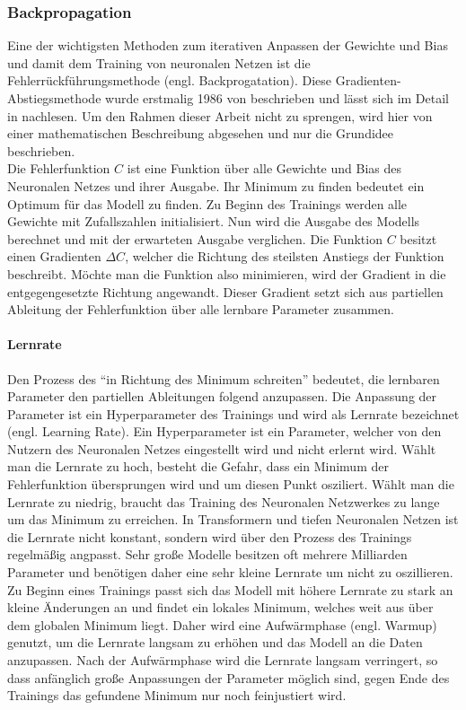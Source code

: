 \subsubsection{Backpropagation}
Eine der wichtigsten Methoden zum iterativen Anpassen der Gewichte und Bias und damit dem Training von neuronalen Netzen ist die Fehlerrückführungsmethode (engl.
Backprogatation).
Diese Gradienten-Abstiegsmethode wurde erstmalig 1986 von \citet{backpropagation} beschrieben und lässt sich im Detail in \citet{neuronale-netze} nachlesen.
Um den Rahmen dieser Arbeit nicht zu sprengen, wird hier von einer mathematischen Beschreibung abgesehen und nur die Grundidee beschrieben.\\

Die Fehlerfunktion $C$ ist eine Funktion über alle Gewichte und Bias des Neuronalen Netzes und ihrer Ausgabe.
Ihr Minimum zu finden bedeutet ein Optimum für das Modell zu finden.
Zu Beginn des Trainings werden alle Gewichte mit Zufallszahlen initialisiert.
Nun wird die Ausgabe des Modells berechnet und mit der erwarteten Ausgabe verglichen.
Die Funktion $C$ besitzt einen Gradienten $\Delta C$, welcher die Richtung des steilsten Anstiegs der Funktion beschreibt.
Möchte man die Funktion also minimieren, wird der Gradient in die entgegengesetzte Richtung angewandt.
Dieser Gradient setzt sich aus partiellen Ableitung der Fehlerfunktion über alle lernbare Parameter zusammen.\\

\paragraph{Lernrate}
Den Prozess des \enquote{in Richtung des Minimum schreiten} bedeutet, die lernbaren Parameter den partiellen Ableitungen folgend anzupassen.
Die Anpassung der Parameter ist ein Hyperparameter des Trainings und wird als Lernrate bezeichnet (engl. Learning Rate).
Ein Hyperparameter ist ein Parameter, welcher von den Nutzern des Neuronalen Netzes eingestellt wird und nicht erlernt wird.
Wählt man die Lernrate zu hoch, besteht die Gefahr, dass ein Minimum der Fehlerfunktion übersprungen wird und um diesen Punkt osziliert.
Wählt man die Lernrate zu niedrig, braucht das Training des Neuronalen Netzwerkes zu lange um das Minimum zu erreichen.
In Transformern und tiefen Neuronalen Netzen ist die Lernrate nicht konstant, sondern wird über den Prozess des Trainings regelmäßig angpasst.
Sehr große Modelle besitzen oft mehrere Milliarden Parameter und benötigen daher eine sehr kleine Lernrate um nicht zu oszillieren.
Zu Beginn eines Trainings passt sich das Modell mit höhere Lernrate zu stark an kleine Änderungen an und findet ein lokales Minimum, welches weit aus über dem globalen Minimum liegt.
Daher wird eine Aufwärmphase (engl. Warmup) genutzt, um die Lernrate langsam zu erhöhen und das Modell an die Daten anzupassen.
Nach der Aufwärmphase wird die Lernrate langsam verringert, so dass anfänglich große Anpassungen der Parameter möglich sind, gegen Ende des Trainings das gefundene Minimum nur noch feinjustiert wird.\\

